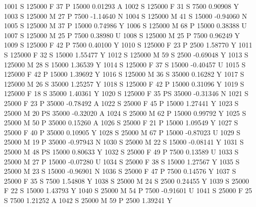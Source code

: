 \documentclass{article}
\begin{document}
\begin{Schunk}
\begin{Soutput}
1001      S     125000   F  37         P  15000   0.01293    A
1002      S     125000   F  31         S   7500   0.90908    Y
1003      S     125000   M  27         P   7500  -1.14640    N
1004      S     125000   M  41         S  15000  -0.94060    N
1005      S     125000   M  37         P  15000   0.74986    Y
1006      S     125000   M  68         P  15000   0.38388    U
1007      S     125000   M  25         P   7500   0.38980    U
1008      S     125000   M  25         P   7500   0.96249    Y
1009      S     125000   F  42         P   7500   0.40100    Y
1010      S     125000   F  23         P   2500   1.58770    Y
1011      S     125000   F  32         S  15000   1.55477    Y
1012      S     125000   M  59         S   2500  -0.69048    Y
1013      S     125000   M  28         S  15000   1.36539    Y
1014      S     125000   F  37         S  15000  -0.40457    U
1015      S     125000   F  42         P  15000   1.39692    Y
1016      S     125000   M  36         S  35000   0.16282    Y
1017      S     125000   M  26         S  35000   1.25257    Y
1018      S     125000   F  42         P  15000   0.31096    Y
1019      S     125000   F  18         S  35000   1.40361    Y
1020      S     125000   F  35        PS  35000  -0.31346    N
1021      S      25000   F  23         P  35000  -0.78492    A
1022      S      25000   F  45         P  15000   1.27441    Y
1023      S      25000   M  20        PS  35000  -0.32020    A
1024      S      25000   M  62         P  15000   0.99792    Y
1025      S      25000   M  50         P  35000   0.15260    A
1026      S      25000   F  21         P  15000   1.09549    Y
1027      S      25000   F  40         P  35000   0.10905    Y
1028      S      25000   M  67         P  15000  -0.87023    U
1029      S      25000   M  19         P  35000  -0.97943    N
1030      S      25000   M  22         S  15000  -0.08141    Y
1031      S      25000   M  48        PS  15000   0.80633    Y
1032      S      25000   F  49         P   7500   0.13589    U
1033      S      25000   M  27         P  15000  -0.07280    U
1034      S      25000   F  38         S  15000   1.27567    Y
1035      S      25000   M  23         S  15000  -0.96901    N
1036      S      25000   F  47         P   7500   0.14576    Y
1037      S      25000   F  35         S   7500   1.54808    Y
1038      S      25000   M  24         S   2500   0.24455    Y
1039      S      25000   F  22         S  15000   1.43793    Y
1040      S      25000   M  54         P   7500  -0.91601    U
1041      S      25000   F  25         S   7500   1.21252    A
1042      S      25000   M  59         P   2500   1.39241    Y

\end{Soutput}
\end{Schunk}
\end{document}
